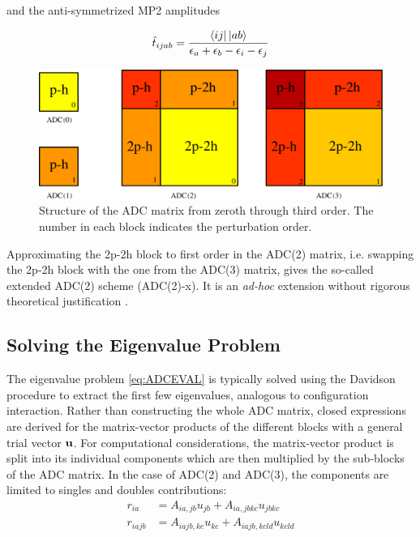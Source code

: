 \noindent and the anti-symmetrized MP2 amplitudes

\begin{equation}
\hat{t}_{ijab} = \frac{\sbra{ij}\sket{ab}}{\eps_a + \eps_b - \eps_i - \eps_j}
\end{equation}

\begin{figure}
\centering
\includegraphics[scale=0.4]{Pics/ADCMAT2}
\caption[Structure of the ADC matrix from zeroth through third order.]{Structure of the ADC matrix from zeroth through third order. The number in each block indicates the perturbation order.}
\label{fig:ADCMAT}
\end{figure}

Approximating the 2p-2h block to first order in the ADC(2) matrix, i.e. swapping the 2p-2h block with the one from the ADC(3) matrix, gives the so-called extended ADC(2) scheme (ADC(2)-x). It is an \emph{ad-hoc} extension without rigorous theoretical justification \cite{Tro1995}.  

\subsection{Solving the Eigenvalue Problem \label{sec:ADC_DAV}}

The eigenvalue problem \ref{eq:ADCEVAL} is typically solved using the Davidson procedure to extract the first few eigenvalues, analogous to configuration interaction. Rather than constructing the whole ADC matrix, closed expressions are derived for the matrix-vector products of the different blocks with a general trial vector $\mathbf{u}$. For computational considerations, the matrix-vector product is split into its individual components which are then multiplied by the sub-blocks of the ADC matrix. In the case of ADC(2) and ADC(3), the components are limited to singles and doubles contributions:
\begin{align}
r_{ia} &= A_{ia,jb} u_{jb} + A_{ia,jbkc} u_{jbkc} \\
r_{iajb} &= A_{iajb,kc} u_{kc} + A_{iajb,kcld} u_{kcld} 
\end{align}

